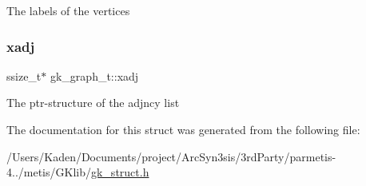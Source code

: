 The labels of the vertices \mbox{\label{a00638_a4ab46970ef24e35f54e8ae6b3c15662f}} 
\subsubsection{\texorpdfstring{xadj}{xadj}}
{\footnotesize\ttfamily ssize\+\_\+t$\ast$ gk\+\_\+graph\+\_\+t\+::xadj}

The ptr-\/structure of the adjncy list 

The documentation for this struct was generated from the following file\+:\begin{DoxyCompactItemize}
\item 
/\+Users/\+Kaden/\+Documents/project/\+Arc\+Syn3sis/3rd\+Party/parmetis-\/4../metis/\+G\+Klib/\hyperlink{a00080}{gk\+\_\+struct.\+h}\end{DoxyCompactItemize}
